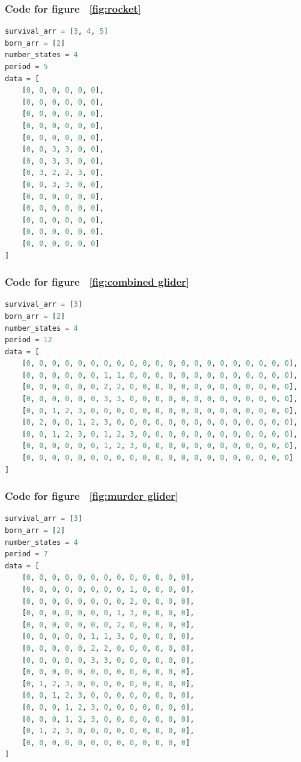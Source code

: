 \documentclass[12pt]{article}
\numberwithin{figure}{section} %
\begin{document}
\subsubsection{Code for figure ~\ref{fig:rocket}}
\label{subsubsection:rocket}
\begin{lstlisting}[language = Python]
survival_arr = [3, 4, 5]
born_arr = [2]
number_states = 4
period = 5
data = [
    [0, 0, 0, 0, 0, 0],
    [0, 0, 0, 0, 0, 0],
    [0, 0, 0, 0, 0, 0],
    [0, 0, 0, 0, 0, 0],
    [0, 0, 0, 0, 0, 0],
    [0, 0, 3, 3, 0, 0],
    [0, 0, 3, 3, 0, 0],
    [0, 3, 2, 2, 3, 0], 
    [0, 0, 3, 3, 0, 0],
    [0, 0, 0, 0, 0, 0],
    [0, 0, 0, 0, 0, 0],
    [0, 0, 0, 0, 0, 0],
    [0, 0, 0, 0, 0, 0],
    [0, 0, 0, 0, 0, 0]
]
\end{lstlisting}

\subsubsection{Code for figure ~\ref{fig:combined glider}}
\label{subsubsection:combined glider}
\begin{lstlisting}[language = Python]
survival_arr = [3]
born_arr = [2]
number_states = 4
period = 12
data = [
    [0, 0, 0, 0, 0, 0, 0, 0, 0, 0, 0, 0, 0, 0, 0, 0, 0, 0, 0, 0, 0],
    [0, 0, 0, 0, 0, 0, 1, 1, 0, 0, 0, 0, 0, 0, 0, 0, 0, 0, 0, 0, 0],
    [0, 0, 0, 0, 0, 0, 2, 2, 0, 0, 0, 0, 0, 0, 0, 0, 0, 0, 0, 0, 0],
    [0, 0, 0, 0, 0, 0, 3, 3, 0, 0, 0, 0, 0, 0, 0, 0, 0, 0, 0, 0, 0],
    [0, 0, 1, 2, 3, 0, 0, 0, 0, 0, 0, 0, 0, 0, 0, 0, 0, 0, 0, 0, 0],
    [0, 2, 0, 0, 1, 2, 3, 0, 0, 0, 0, 0, 0, 0, 0, 0, 0, 0, 0, 0, 0],
    [0, 0, 1, 2, 3, 0, 1, 2, 3, 0, 0, 0, 0, 0, 0, 0, 0, 0, 0, 0, 0],
    [0, 0, 0, 0, 0, 0, 1, 2, 3, 0, 0, 0, 0, 0, 0, 0, 0, 0, 0, 0, 0],
    [0, 0, 0, 0, 0, 0, 0, 0, 0, 0, 0, 0, 0, 0, 0, 0, 0, 0, 0, 0, 0]
]
\end{lstlisting}

\subsubsection{Code for figure ~\ref{fig:murder glider}}
\label{subsubsection:murder glider}
\begin{lstlisting}[language = Python]
survival_arr = [3]
born_arr = [2]
number_states = 4
period = 7
data = [
    [0, 0, 0, 0, 0, 0, 0, 0, 0, 0, 0, 0, 0],
    [0, 0, 0, 0, 0, 0, 0, 0, 1, 0, 0, 0, 0],
    [0, 0, 0, 0, 0, 0, 0, 0, 2, 0, 0, 0, 0],
    [0, 0, 0, 0, 0, 0, 0, 1, 3, 0, 0, 0, 0],
    [0, 0, 0, 0, 0, 0, 0, 2, 0, 0, 0, 0, 0],
    [0, 0, 0, 0, 0, 1, 1, 3, 0, 0, 0, 0, 0],
    [0, 0, 0, 0, 0, 2, 2, 0, 0, 0, 0, 0, 0],
    [0, 0, 0, 0, 0, 3, 3, 0, 0, 0, 0, 0, 0],
    [0, 0, 0, 0, 0, 0, 0, 0, 0, 0, 0, 0, 0],
    [0, 1, 2, 3, 0, 0, 0, 0, 0, 0, 0, 0, 0],
    [0, 0, 1, 2, 3, 0, 0, 0, 0, 0, 0, 0, 0],
    [0, 0, 0, 1, 2, 3, 0, 0, 0, 0, 0, 0, 0],
    [0, 0, 0, 1, 2, 3, 0, 0, 0, 0, 0, 0, 0],
    [0, 1, 2, 3, 0, 0, 0, 0, 0, 0, 0, 0, 0],
    [0, 0, 0, 0, 0, 0, 0, 0, 0, 0, 0, 0, 0]
]

\end{lstlisting}
\end{document}
